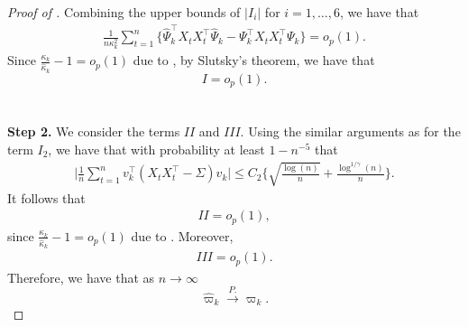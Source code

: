 \documentclass[11pt]{article}
\theoremstyle{plain}
\theoremstyle{definition}
\begin{document}
\begin{proof}[Proof of ]
Combining the upper bounds of $|I_i|$ for $i = 1, \dots, 6$, we have that
\begin{align*}
    \frac{1}{n\kappa_k^2}\sum_{t = 1}^n\big\{\widehat{\Psi}_k^{\top}X_tX_t^{\top}\widehat{\Psi}_k - \Psi_k^{\top}X_tX_t^{\top}\Psi_k\big\} = o_p(1).
\end{align*}
Since $\frac{\kappa_k}{\widehat \kappa_k} - 1 = o_p(1)$ due to , by Slutsky's theorem, we have that
$$I = o_p(1).$$
\\
\\
\textbf{Step 2.} We consider the terms $II$ and $III$. Using the similar arguments as for the term $I_2$, we have that with probability at least $1 - n^{-5}$ that
\begin{align*}
  \bigg | \frac{1}{n}\sum_{t=1}^n v_k^{\top}(X_tX_t^{\top} - \Sigma)v_k  \bigg |  \le  C_2 \bigg\{  \sqrt { \frac{\log(n) }{n}  }  +   \frac{ \log^{1/\gamma }( n) }{n} \bigg \}.
\end{align*}
It follows that
\begin{align*}
    II = o_p(1),
\end{align*}
since $\frac{\kappa_k}{\widehat \kappa_k} - 1 = o_p(1)$ due to . Moreover,
\begin{align*}
    III = o_p(1).
\end{align*}
Therefore, we have that as $n \to \infty$
$$\widehat{\varpi}_k \overset{P.}{\longrightarrow} \varpi_k.$$
\end{proof}
\end{document}
